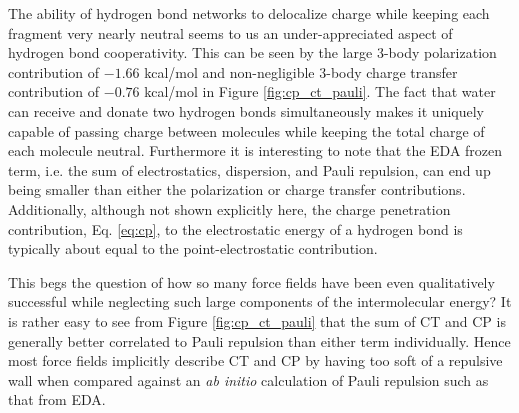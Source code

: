 \documentclass[journal=jctcce,manuscript=article]{achemso}
\begin{document}
The ability of hydrogen bond networks to delocalize charge while keeping each fragment very nearly neutral seems to us an under-appreciated aspect of hydrogen bond cooperativity. This can be seen by the large 3-body polarization contribution of $-1.66$ kcal/mol and non-negligible 3-body charge transfer contribution of $-0.76$ kcal/mol in Figure \ref{fig:cp_ct_pauli}. The fact that water can receive and donate two hydrogen bonds simultaneously makes it uniquely capable of passing charge between molecules while keeping the total charge of each molecule neutral. Furthermore it is interesting to note that the EDA frozen term, i.e. the sum of electrostatics, dispersion, and Pauli repulsion, can end up being smaller than either the polarization or charge transfer contributions. Additionally, although not shown explicitly here, the charge penetration contribution, Eq. \ref{eq:cp}, to the electrostatic energy of a hydrogen bond is typically about equal to the point-electrostatic contribution.

This begs the question of how so many force fields have been even qualitatively successful while neglecting such large components of the intermolecular energy? It is rather easy to see from Figure \ref{fig:cp_ct_pauli} that the sum of CT and CP is generally better correlated to Pauli repulsion than either term individually. Hence most force fields implicitly describe CT and CP by having too soft of a repulsive wall when compared against an \textit{ab initio} calculation of Pauli repulsion such as that from EDA.
\end{document}
